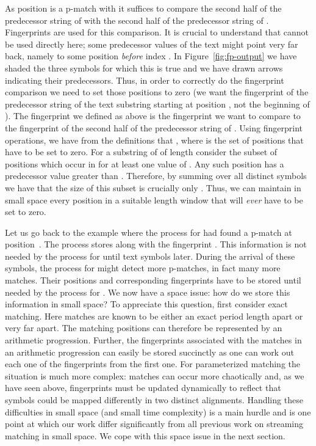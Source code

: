 \documentclass[11pt,a4paper]{article}
\theoremstyle{theorem}
\newcommand{\pmatch}{\mbox{p-match}\xspace}
\newcommand{\pmatches}{\mbox{p-matches}\xspace}
\begin{document}
As position  is a \pmatch with  it suffices to compare the second half of the predecessor string of  with the second half of the predecessor string of . Fingerprints are used for this comparison. It is crucial to understand that  cannot be used directly here;
some predecessor values of the text might point very far back, namely to some position \emph{before} index . In Figure~\ref{fig:fp-output} we have shaded the three symbols for which this is true and we have drawn arrows indicating their predecessors. Thus, in order to correctly do the fingerprint comparison we need to set those positions to zero (we want the fingerprint of the predecessor string of the text substring starting at position , not the beginning of ). The fingerprint we defined as  above is the fingerprint we want to compare to the fingerprint of the second half of the predecessor string of . Using fingerprint operations, we have from the definitions that , where  is the set of positions that have to be set to zero. For a substring of  of length  consider the subset of positions which occur in  for at least one value of . Any such position has a predecessor value greater than . Therefore, by summing over all distinct symbols we have that the size of this subset is crucially only . Thus, we can maintain in small space every position in a suitable length window that will \emph{ever} have to be set to zero.

Let us go back to the example where the process for  had found a \pmatch at position~. The process stores  along with the fingerprint . This information is not needed by the process for  until  text symbols later. During the arrival of these symbols, the process for  might detect more \pmatches, in fact many more matches. Their positions and corresponding fingerprints have to be stored until needed by the process for . We now have a space issue: how do we store this information in small space? To appreciate this question, first consider exact matching. Here matches are known to be either an exact period length apart or very far apart. The matching positions can therefore be represented by an arithmetic progression. Further, the fingerprints associated with the matches in an arithmetic progression can easily be stored succinctly as one can work out each one of the fingerprints from the first one.
For parameterized matching the situation is much more complex: matches can occur more chaotically and, as we have seen above, fingerprints must be updated dynamically to reflect that symbols could be mapped differently in two distinct alignments. Handling these difficulties in small space (and small time complexity) is a main hurdle and is one point at which our work differ significantly from all previous work on streaming matching in small space.
We cope with this space issue in the next section.
\end{document}
